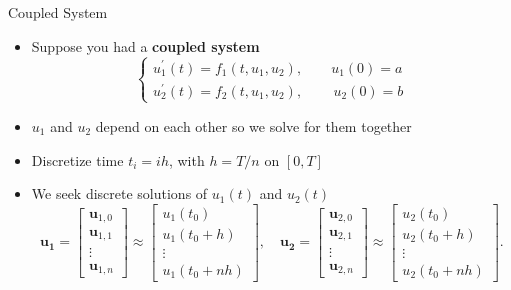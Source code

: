 \documentclass[10pt]{beamer}
\begin{document}

\begin{frame}{Coupled System}
\begin{itemize}
\item Suppose you had a \textbf{coupled system}  
\[
\begin{cases}
u_1^\prime(t) = f_1(t,u_1,u_2), \qquad u_1(0) = a \\
u_2^\prime(t) = f_2(t,u_1,u_2), \quad \quad \, u_2(0) = b 
\end{cases}
\]
\item $u_1$ and $u_2$ depend on each other so we solve for them together 
\item Discretize time $t_i = ih$, with $h=T/n$ on $[0,T]$

\item We seek discrete solutions of $u_1(t)$ and $u_2(t)$
\[
\mathbf{u_1} = 
\begin{bmatrix} 
\textbf{u}_{1,0} \\ 
\textbf{u}_{1,1} \\ 
\vdots \\  
\textbf{u}_{1,n} 
\end{bmatrix}
\approx  
\begin{bmatrix} 
u_1(t_0) \\ 
u_1(t_0 + h) \\ 
\vdots \\  
u_1(t_0 + nh) 
\end{bmatrix},
\quad
\mathbf{u_2} = 
\begin{bmatrix} 
\textbf{u}_{2,0} \\ 
\textbf{u}_{2,1} \\ 
\vdots \\  
\textbf{u}_{2,n} 
\end{bmatrix}
\approx  
\begin{bmatrix} 
u_2(t_0) \\ 
u_2(t_0 + h) \\ 
\vdots \\  
u_2(t_0 + nh) 
\end{bmatrix}.
\]

\end{itemize}
\end{frame}
\end{document}
